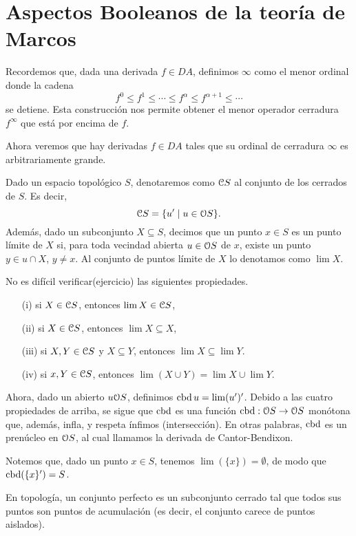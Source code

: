 \chapter{Aspectos Booleanos de la teoría de Marcos}



Recordemos que, dada una derivada $f\in DA$,
definimos $\infty$ como el menor ordinal donde la cadena
\[
    f^0\leq f^1\leq \cdots\leq f^\alpha \leq f^{\alpha+1} \leq \cdots
\]
se detiene.
Esta construcción nos permite obtener
el menor operador cerradura $f^\infty$
que está por encima de $f$.

Ahora veremos que hay derivadas $f\in DA$ tales que
su ordinal de cerradura $\infty$ es arbitrariamente grande.

Dado un espacio topológico $S$,
denotaremos como $\cal CS$ al conjunto de los cerrados de $S$.
Es decir,
\[
    \cal CS = \{u'\mid u\in\cal OS\}
.\]
Además, dado un subconjunto $X\subseteq S$,
decimos que un punto $x\in S$ es un punto límite de $X$ si,
para toda vecindad abierta $u\in\cal OS$ de $x$,
existe un punto $y\in u\cap X$, $y\neq x$.
Al conjunto de puntos límite de $X$ lo denotamos como $\lim X$.

No es difícil verificar(ejercicio) las siguientes propiedades.
\begin{itemize}
    \item[(i)] si $X\in\cal CS$, entonces $\lim X\in\cal CS$,
    \item[(ii)] si $X\in\cal CS$, entonces $\lim X\subseteq X$,
    \item[(iii)] si $X,Y\in\cal CS$ y $X\subseteq Y$,
        entonces $\lim X\subseteq\lim Y$.
    \item[(iv)] si $x,Y\in\cal CS$,
        entonces $\lim(X\cup Y)=\lim X\cup\lim Y$.
\end{itemize}

Ahora, dado un abierto $u\cal OS$, definimos $\cbd u = \lim(u')'$.
Debido a las cuatro propiedades de arriba,
se sigue que $\cbd$ es una función $\cbd:\cal OS\to\cal OS$
monótona que, además, infla, y respeta ínfimos (intersección).
En otras palabras, $\cbd$ es un prenúcleo en $\cal OS$,
al cual llamamos la derivada de Cantor-Bendixon.

Notemos que, dado un punto $x\in S$,
tenemos $\lim(\{x\})=\emptyset$,
de modo que $\cbd(\{x\}')=S$.

En topología, un conjunto perfecto es un subconjunto cerrado tal que todos sus puntos son puntos de acumulación (es decir, el conjunto carece de puntos aislados).

